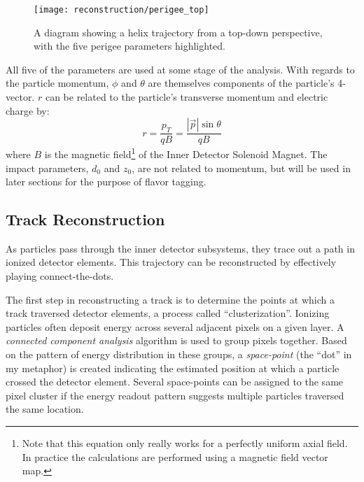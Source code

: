             \begin{figure}[tbh]
                \texttt{[image: reconstruction/perigee\_top]}
                \caption{
                    A diagram showing a helix trajectory from a top-down perspective,
                        with the five perigee parameters highlighted.
                }
                \label{fig:perigee_params_top}
            \end{figure}

            All five of the parameters are used at some stage of the analysis.
            With regards to the particle momentum, $\phi$ and $\theta$ are themselves components of the particle's 4-vector.
            $r$ can be related to the particle's transverse momentum and electric charge by:
            \begin{equation}
                r = \frac{p_T}{qB} = \frac{|\vec{p}| \sin \theta}{qB}
            \end{equation}
            where $B$ is the magnetic field\footnote{
                    Note that this equation only really works for a perfectly uniform axial field.
                    In practice the calculations are performed using a magnetic field vector map.
                } of the Inner Detector Solenoid Magnet\cite{thesis_track_sim_and_reco}.
            The impact parameters, $d_0$ and $z_0$, are not related to momentum,
                but will be used in later sections for the purpose of flavor tagging.

        \subsection{Track Reconstruction}

            As particles pass through the inner detector subsystems, they trace out a path in ionized detector elements.
            This trajectory can be reconstructed by effectively playing connect-the-dots.

            The first step in reconstructing a track is to determine the points at which a track traversed detector elements,
                a process called ``clusterization''\cite{atlas_track_reco_performance}.
            Ionizing particles often deposit energy across several adjacent pixels on a given layer.
            A \textit{connected component analysis} algorithm\cite{connected_component_analysis}
                is used to group pixels together.
            Based on the pattern of energy distribution in these groups,
                a \textit{space-point} (the ``dot'' in my metaphor) 
                is created indicating the estimated position at which a particle crossed the detector element.
            Several space-points can be assigned to the same pixel cluster
                if the energy readout pattern suggests multiple particles traversed the same location.

